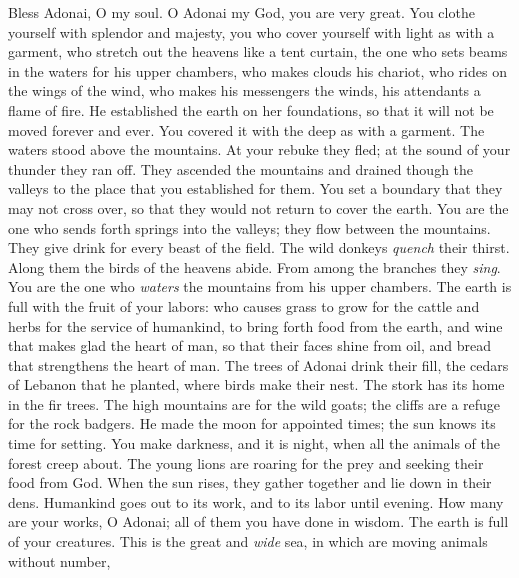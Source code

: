 \begin{biblechapter} %
 Bless Adonai, O my soul. 
O Adonai my God, you are very great. 
You clothe yourself with splendor and majesty,
\verse you who cover yourself with light as with a garment, 
who stretch out the heavens like a tent curtain,
\verse the one who sets beams in the waters for his upper chambers, 
who makes clouds his chariot, 
who rides on the wings of the wind,
\verse who makes his messengers the winds, 
his attendants a flame of fire.
\verse He established the earth on her foundations, 
so that it will not be moved forever and ever.
\verse You covered it with the deep as with a garment. 
The waters stood above the mountains.
\verse At your rebuke they fled; 
at the sound of your thunder they ran off.
\verse They ascended the mountains and drained though the valleys 
to the place that you established for them.
\verse You set a boundary that they may not cross over, 
so that they would not return to cover the earth.
\verse You are the one who sends forth springs into the valleys; 
they flow between the mountains.
\verse They give drink for every beast of the field. 
The wild donkeys \textit{quench} their thirst.
\verse Along them the birds of the heavens abide. 
From among the branches they \textit{sing}.
\verse You are the one who \textit{waters} the mountains 
from his upper chambers. 
The earth is full with the fruit of your labors:
\verse who causes grass to grow for the cattle 
and herbs for the service of humankind, 
to bring forth food from the earth,
\verse and wine that makes glad the heart of man, 
so that their faces shine from oil, 
and bread that strengthens the heart of man.
\verse The trees of Adonai drink their fill, 
the cedars of Lebanon that he planted,
\verse where birds make their nest. 
The stork has its home in the fir trees.
\verse The high mountains are for the wild goats; 
the cliffs are a refuge for the rock badgers.
\verse He made the moon for appointed times; 
the sun knows its time for setting.
\verse You make darkness, and it is night, 
when all the animals of the forest creep about.
\verse The young lions are roaring for the prey 
and seeking their food from God.
\verse When the sun rises, they gather together 
and lie down in their dens.
\verse Humankind goes out to its work, 
and to its labor until evening.
\verse How many are your works, O Adonai; 
all of them you have done in wisdom. 
The earth is full of your creatures.
\verse This is the great and \textit{wide} sea, 
in which are moving animals without number, 

\end{biblechapter}

